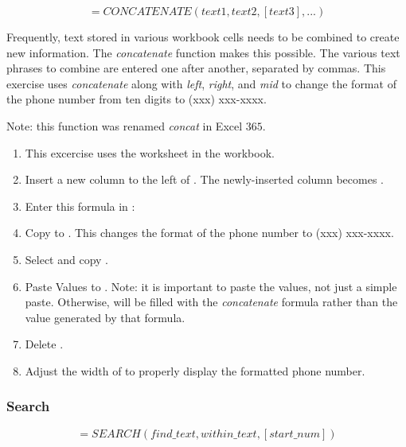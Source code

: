 \[ =CONCATENATE(text1, text2, [text3], ...) \]

Frequently, text stored in various workbook cells needs to be combined to create new information. The \textit{concatenate} function makes this possible. The various text phrases to combine are entered one after another, separated by commas. This exercise uses \textit{concatenate} along with \textit{left}, \textit{right}, and \textit{mid} to change the format of the phone number from ten digits to (xxx) xxx-xxxx.

 Note: this function was renamed \textit{concat} in Excel $ 365 $.

\begin{enumerate}
	\item This excercise uses the  worksheet in the  workbook.
	\item Insert a new column to the left of . The newly-inserted column becomes .
	\item Enter this formula in : 
	\item Copy  to . This changes the format of the phone number to (xxx) xxx-xxxx.
	\item Select and copy .
	\item Paste Values to . Note: it is important to paste the values, not just a simple paste. Otherwise,  will be filled with the \textit{concatenate} formula rather than the value generated by that formula.
	\item Delete .
	\item Adjust the width of  to properly display the formatted phone number.
\end{enumerate}

\subsubsection{Search}	

\[ =SEARCH(find\_text, within\_text, [start\_num]) \]

